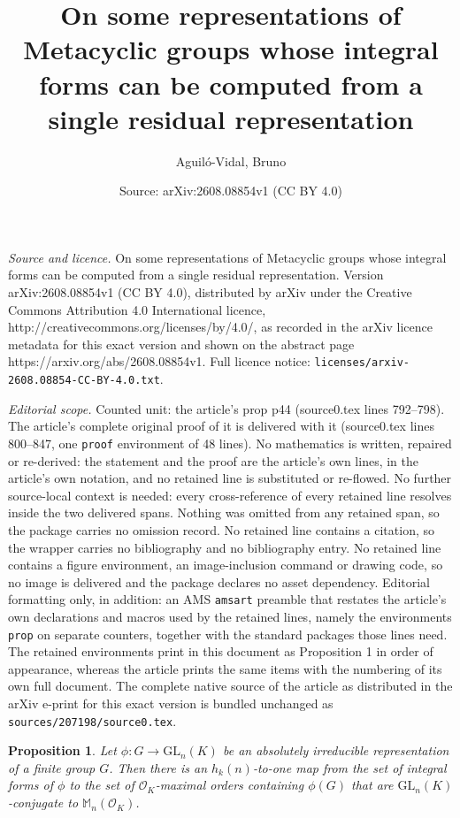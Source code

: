 \documentclass[10pt,a4paper]{amsart}
\title{On some representations of Metacyclic groups whose integral forms can be computed from a single residual representation}
\author{Aguil\'o-Vidal, Bruno}
\date{Source: arXiv:2608.08854v1 (CC BY 4.0)}
\newtheorem{prop}{Proposition}
\begin{document}
\maketitle

\noindent\emph{Source and licence.} On some representations of Metacyclic groups whose integral forms can be computed from a single residual representation. Version arXiv:2608.08854v1 (CC BY 4.0), distributed by arXiv under the Creative Commons Attribution 4.0 International licence, http://creativecommons.org/licenses/by/4.0/, as recorded in the arXiv licence metadata for this exact version and shown on the abstract page https://arxiv.org/abs/2608.08854v1. Full licence notice: \texttt{licenses/arxiv-2608.08854-CC-BY-4.0.txt}.\par\smallskip

\noindent\textit{Editorial scope.} Counted unit: the article's prop p44 (source0.tex lines 792--798). The article's complete original proof of it is delivered with it (source0.tex lines 800--847, one \texttt{proof} environment of 48 lines). No mathematics is written, repaired or re-derived: the statement and the proof are the article's own lines, in the article's own notation, and no retained line is substituted or re-flowed.  No further source-local context is needed: every cross-reference of every retained line resolves inside the two delivered spans.  Nothing was omitted from any retained span, so the package carries no omission record.  No retained line contains a citation, so the wrapper carries no bibliography and no bibliography entry.  No retained line contains a figure environment, an image-inclusion command or drawing code, so no image is delivered and the package declares no asset dependency.  Editorial formatting only, in addition: an AMS \texttt{amsart} preamble that restates the article's own declarations and macros used by the retained lines, namely the environments \texttt{prop} on separate counters, together with the standard packages those lines need.  The retained environments print in this document as Proposition 1 in order of appearance, whereas the article prints the same items with the numbering of its own full document.  The complete native source of the article as distributed in the arXiv e-print for this exact version is bundled unchanged as \texttt{sources/207198/source0.tex}.
\begin{prop}\label{p44}
    Let $\phi:G\rightarrow\mathrm{GL}_n(K)$ be an absolutely irreducible 
    representation of a finite group $G$. Then there is an $h_k(n)$-to-one
    map from the set of integral forms of $\phi$ to the set of
    $\mathcal{O}_K$-maximal orders containing $\phi(G)$ that are 
    $\mathrm{GL}_n(K)$-conjugate to $\mathbb{M}_n(\mathcal{O}_K)$.
\end{prop}
\end{document}
